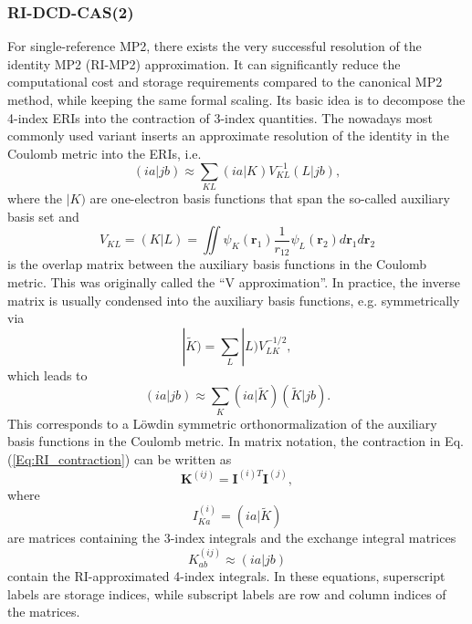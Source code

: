 \subsubsection{RI-DCD-CAS(2)}
\label{Sec:RIDCD}
For single-reference MP2, there exists the very successful resolution of the identity MP2 (RI-MP2) approximation.\cite{FeyerFK_1993_359} It can significantly reduce the computational cost and storage requirements compared to the canonical MP2 method, while keeping the same formal scaling. Its basic idea is to decompose the 4-index ERIs into the contraction of 3-index quantities. The nowadays most commonly used variant inserts an approximate resolution of the identity in the Coulomb metric into the ERIs, i.e.
\begin{equation}
(ia|jb) \approx \sum_{KL} (ia|K)V_{KL}^{-1}(L|jb),
\end{equation}
where the $|K)$ are one-electron basis functions that span the so-called auxiliary basis set and 
\begin{equation}
V_{KL} = (K|L) = \iint \psi_K(\mathbf{r}_1) \frac{1}{r_{12}} \psi_L(\mathbf{r}_2) d\mathbf{r}_1 d\mathbf{r}_2
\end{equation}
is the overlap matrix between the auxiliary basis functions in the Coulomb metric. This was originally called the ``V approximation''.\cite{VahtrAF_1993_514} In practice, the inverse matrix is usually condensed into the auxiliary basis functions, e.g. symmetrically via
\begin{equation}
|\tilde{K}) = \sum_L |L) V_{LK}^{-1/2},
\end{equation}
which leads to
\begin{equation}
\label{Eq:RI_contraction}
(ia|jb) \approx \sum_K (ia|\tilde{K})(\tilde{K}|jb). 
\end{equation}
This corresponds to a Löwdin symmetric orthonormalization of the auxiliary basis functions in the Coulomb metric. In matrix notation, the contraction in Eq. (\ref{Eq:RI_contraction}) can be written as
\begin{equation}
\label{Eq:RI_contraction_matrix}
\mathbf{K}^{(ij)} = \mathbf{I}^{(i)T}\mathbf{I}^{(j)},
\end{equation}
where
\begin{equation}
I^{(i)}_{Ka} = (ia|\tilde{K})
\end{equation}
are matrices containing the 3-index integrals and the exchange integral matrices
\begin{equation}
K^{(ij)}_{ab} \approx (ia|jb)
\end{equation}
contain the RI-approximated 4-index integrals. In these equations, superscript labels are storage indices, while subscript labels are row and column indices of the matrices. 

